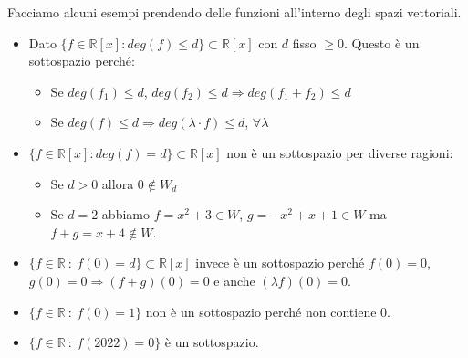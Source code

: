 \begin{example}
Facciamo alcuni esempi prendendo delle funzioni all'interno degli spazi vettoriali.
\begin{itemize}
    \item Dato $\{f \in \mathbb{R}[x] : deg(f) \leq d\} \subset \mathbb{R}[x]$ con $d$ fisso $\geq 0$. Questo è un sottospazio perché:
    \begin{itemize}
    	\item Se $deg(f_1) \leq d$, $deg(f_2) \leq d \Longrightarrow deg(f_1 + f_2) \leq d$
    	\item  Se $deg(f) \leq d \Longrightarrow deg(\lambda \cdot f) \leq d$, $\forall \lambda$
    \end{itemize}
    \item $\{f \in \mathbb{R}[x] : deg(f) = d\} \subset \mathbb{R}[x]$ non è un sottospazio per diverse ragioni:
    \begin{itemize}
    	\item Se $d>0$ allora $0 \notin W_d$
    	\item Se $d=2$ abbiamo $f = x^2 + 3 \in W$, $g = -x^2 + x + 1 \in W$ ma $f + g = x + 4 \notin W$.
    \end{itemize}
    \item $\{f \in \mathbb{R} \: : \: f(0) = d\} \subset \mathbb{R}[x]$ invece è un sottospazio perché $f(0) = 0$, $g(0)=0 \Longrightarrow (f + g)(0) = 0$ e anche $(\lambda f)(0) = 0$.
    \item $\{f \in \mathbb{R} \: : \: f(0) = 1\}$ non è un sottospazio perché non contiene 0.
    \item $\{f \in \mathbb{R} \: : \: f(2022) = 0\}$ è un sottospazio.
\end{itemize}
\end{example}

